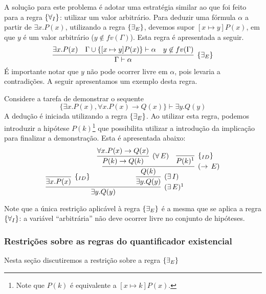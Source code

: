 A solução para este problema é adotar uma estratégia similar ao que
foi feito para a regra $\scriptsize{\{\forall_I}\}$: utilizar um valor arbitrário. Para
deduzir uma fórmula $\alpha$ a partir de $\exists x. P(x)$, utilizando
a regra $\scriptsize{\{\exists_E}\}$, devemos supor $[x\mapsto y]P(x)$, em que $y$ é um
valor arbitrário ($y\not\in fv(\Gamma)$). Esta regra é apresentada a
seguir.
\[
\infer[\existsE]{\Gamma\vdash\alpha}
        {\exists x. P(x) & \Gamma \cup \{[x\mapsto y] P (x)\}\vdash
          \alpha & y \not\in fv(\Gamma)}
\]
É importante notar que $y$ não pode ocorrer livre em $\alpha$, pois
levaria a contradições.
A seguir apresentamos um exemplo desta regra.
\begin{Example}
Considere a tarefa de demonstrar o sequente
\[
\{\exists x. P(x), \forall x. P(x) \to Q(x) \} \vdash \exists y. Q(y)
\]
A dedução é iniciada utilizando a regra $\scriptsize{\{\exists_E}\}$. Ao utilizar esta
regra, podemos introduzir a hipótese $P(k)$\footnote{Note que $P(k)$ é
equivalente a $[x\mapsto k]P(x)$.} que possibilita utilizar a
introdução da implicação para finalizar a demonstração. Esta é
apresentada abaixo:
\[
                     \infer[(\exists\,E)^{1}]
                           {\exists y. Q(y)}
                           {\infer[\Id]{\exists x. P(x)}{} &
                             \infer[(\exists\,I)]
                                   {\exists y. Q(y)}
                                   {
                                     \infer[(\rightarrow\,E)]
                                           {Q(k)}
                                           {
                                             \infer[(\forall\,E)]
                                                   {P(k)\rightarrow Q(k)}
                                                   {\forall x. P(x)\rightarrow Q(x)}
                                             &
                                                   \infer[\Id]{P(k)^1}{}
                                           }
                                   }
                           }
\]
\end{Example}
Note que a única restrição aplicável à regra $\scriptsize{\{\exists_E}\}$ é a mesma que
se aplica a regra $\scriptsize{\{\forall_I}\}$: a variável ``arbitrária'' não deve
ocorrer livre no conjunto de hipóteses.

\subsubsection{Restrições sobre as regras do quantificador
  existencial}

Nesta seção discutiremos a restrição sobre a regra $\scriptsize{\{\exists_E}\}$ 

